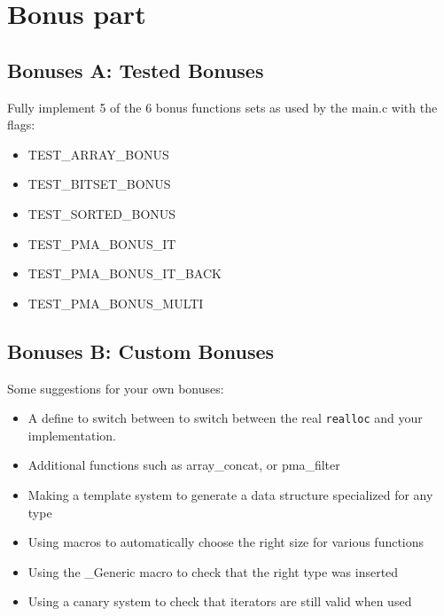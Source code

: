 \documentclass{42-en}
\begin{document}
\chapter{Bonus part}

    \section{Bonuses A: Tested Bonuses}
        Fully implement 5 of the 6 bonus functions sets as used by the main.c with the flags:
        \begin{itemize}\itemsep1pt
            \item TEST\_ARRAY\_BONUS
            \item TEST\_BITSET\_BONUS
            \item TEST\_SORTED\_BONUS
            \item TEST\_PMA\_BONUS\_IT
            \item TEST\_PMA\_BONUS\_IT\_BACK
            \item TEST\_PMA\_BONUS\_MULTI
        \end{itemize}
    
    \section{Bonuses B: Custom Bonuses}
        Some suggestions for your own bonuses:
        \begin{itemize}\itemsep7pt
            \item A define to switch between to switch between the real \texttt{realloc} and your implementation.
            \item Additional functions such as array\_concat, or pma\_filter
            \item Making a template system to generate a data structure specialized for any type
            \item Using macros to automatically choose the right size for various functions
            \item Using the \_Generic macro to check that the right type was inserted
            \item Using a canary system to check that iterators are still valid when used
        \end{itemize}
\end{document}
